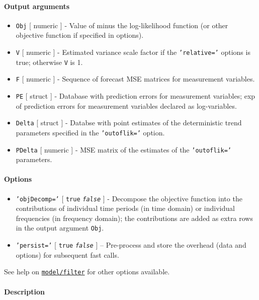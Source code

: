\paragraph{Output arguments}\label{output-arguments}

\begin{itemize}
\item
  \texttt{Obj} {[} numeric {]} - Value of minus the log-likelihood
  function (or other objective function if specified in options).
\item
  \texttt{V} {[} numeric {]} - Estimated variance scale factor if the
  \texttt{'relative='} options is true; otherwise \texttt{V} is 1.
\item
  \texttt{F} {[} numeric {]} - Sequence of forecast MSE matrices for
  measurement variables.
\item
  \texttt{PE} {[} struct {]} - Database with prediction errors for
  measurement variables; exp of prediction errors for measurement
  variables declared as log-variables.
\item
  \texttt{Delta} {[} struct {]} - Databse with point estimates of the
  deterministic trend parameters specified in the \texttt{'outoflik='}
  option.
\item
  \texttt{PDelta} {[} numeric {]} - MSE matrix of the estimates of the
  \texttt{'outoflik='} parameters.
\end{itemize}

\paragraph{Options}\label{options}

\begin{itemize}
\item
  \texttt{'objDecomp='} {[} \texttt{true} \textbar{}
  \emph{\texttt{false}} {]} - Decompose the objective function into the
  contributions of individual time periods (in time domain) or
  individual frequencies (in frequency domain); the contributions are
  added as extra rows in the output argument \texttt{Obj}.
\item
  \texttt{'persist='} {[} \texttt{true} \textbar{} \emph{\texttt{false}}
  {]} -- Pre-process and store the overhead (data and options) for
  subsequent fast calls.
\end{itemize}

See help on \href{model/filter}{\texttt{model/filter}} for other options
available.

\paragraph{Description}\label{description}

